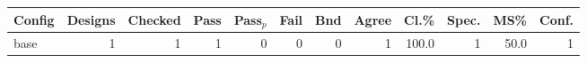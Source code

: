 \begin{tabular}{lrrrrrrrrrrr}
\toprule
Config & Designs & Checked & Pass & Pass$_p$ & Fail & Bnd & Agree & Cl.\% & Spec. & MS\% & Conf. \\
\midrule
base & 1 & 1 & 1 & 0 & 0 & 0 & 1 & 100.0 & 1 & 50.0 & 1 \\
\bottomrule
\end{tabular}
